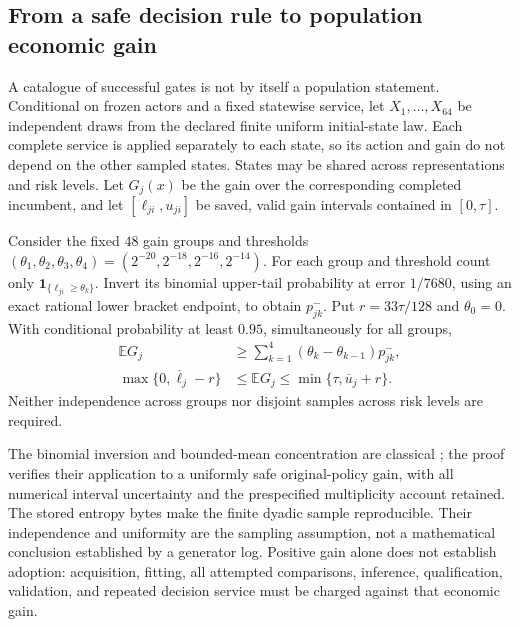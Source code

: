 \subsection{From a safe decision rule to population economic gain}
A catalogue of successful gates is not by itself a population statement.
Conditional on frozen actors and a fixed statewise service, let
$X_1,\ldots,X_{64}$ be independent draws from the declared finite
uniform initial-state law.  Each complete service is applied separately
to each state, so its action and gain do not depend on the other sampled
states.  States may be shared across representations and risk levels.
Let $G_j(x)$ be the gain over the corresponding completed incumbent,
and let $[\ell_{ji},u_{ji}]$ be saved, valid gain intervals contained
in $[0,\tau]$.

\begin{proposition}
\label{prop:population120}
Consider the fixed $48$ gain groups and thresholds
$(\theta_1,\theta_2,\theta_3,\theta_4)
=(2^{-20},2^{-18},2^{-16},2^{-14})$.
For each group and threshold count only
$\boldsymbol1_{\{\ell_{ji}\ge\theta_k\}}$.
Invert its binomial upper-tail probability at error $1/7680$,
using an exact rational lower bracket endpoint, to obtain
$p^-_{jk}$.  Put $r=33\tau/128$ and
$\theta_0=0$.  With conditional probability at least $0.95$,
simultaneously for all groups,
\begin{align}
 \mathbb E G_j
 &\ge \sum_{k=1}^4(\theta_k-\theta_{k-1})p^-_{jk},
 \label{eq:staircase120}\\
 \max\{0,\overline\ell_j-r\}
 &\le\mathbb E G_j
 \le\min\{\tau,\overline u_j+r\}.
 \label{eq:meangain120}
\end{align}
Neither independence across groups nor disjoint samples across risk
levels are required.
\end{proposition}

The binomial inversion and bounded-mean concentration are classical
\citep{clopperpearson1934,hoeffding1963}; the proof verifies their
application to a uniformly safe original-policy gain, with all numerical
interval uncertainty and the prespecified multiplicity account retained.
The stored entropy bytes make the finite dyadic sample reproducible.
Their independence and uniformity are the sampling assumption, not a
mathematical conclusion established by a generator log.
Positive gain alone does not establish adoption: acquisition, fitting,
all attempted comparisons, inference, qualification, validation, and
repeated decision service must be charged against that economic gain.
